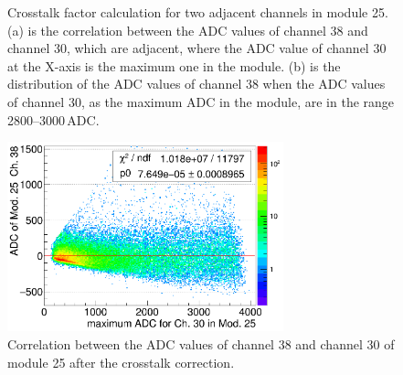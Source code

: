 \documentclass[preprint,sort&compress,12pt]{elsarticle}
\begin{document}
\begin{figure}[!ht]
\hspace{2mm}
\caption{Crosstalk factor calculation for two adjacent channels in module 25. (a) is the correlation between the ADC values of channel 38 and channel 30, which are adjacent, where the ADC value of channel 30 at the X-axis is the maximum one in the module. (b) is the distribution of the ADC values of channel 38 when the ADC values of channel 30, as the maximum ADC in the module, are in the range 2800--3000\,ADC.}\label{fig:xtalk_calc_method}
\end{figure}

\begin{figure}[!ht]
\centering
\includegraphics[width=8cm]{images/xtalk_30_38_after_corr.png}
\caption{Correlation between the ADC values of channel 38 and channel 30 of module 25 after the crosstalk correction.}\label{fig:xtalk_after_corr}
\end{figure}
\end{document}
